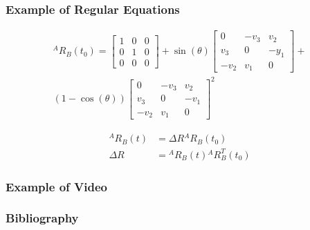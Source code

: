 \documentclass[10pt, aspectratio=169]{beamer}
\theoremstyle{remark}
\theoremstyle{definition}
\begin{document}
\begin{frame}[allowframebreaks]
\frametitle{Example of Regular Equations}
    
    
    \begin{equation}
        \begin{split}
        {}^AR_{B}(t_0)=\left[\begin{array}{ccc}
        1 & 0 & 0 \\
        0 & 1 & 0 \\
        0 & 0 & 0
        \end{array}\right]+
        \sin (\theta)\left[\begin{array}{ccc}
        0 & -v_{3} & v_{2} \\
        v_{3} & 0 & -y_{1} \\
        -v_{2} & v_{1} & 0
        \end{array}\right]+ \\
        (1-\cos (\theta))\left[\begin{array}{ccc}
        0 & -v_{3} & v_{2} \\
        v_{3} & 0 & -v_{1} \\
        -v_{2} & v_{1} & 0
        \end{array}\right]^{2}
        \end{split}
        \end{equation}
        
        \begin{align}
            {}^AR_{B}(t) &= \Delta R {}^AR_{B}(t_0) \\
            \Delta R &= {}^AR_{B}(t) {}^AR_{B}^T(t_0)
        \end{align}
\end{frame}

\begin{frame}[allowframebreaks]
\frametitle{Example of Video}

    
\end{frame}

\begin{frame}[allowframebreaks]
\frametitle{Bibliography}
\printbibliography
\end{frame}
\end{document}
